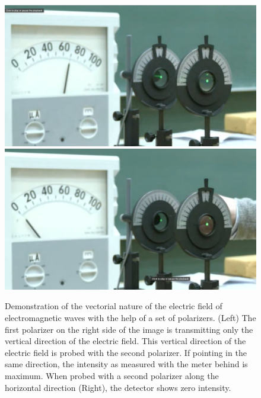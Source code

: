 \documentclass[
  a4paper,
]{book}
\begin{document}
\begin{figure}

\begin{minipage}{0.50\linewidth}
\includegraphics[width=1\linewidth,height=\textheight,keepaspectratio]{electromagnetic-waves/img/vertical_pol.png}
\includegraphics[width=1\linewidth,height=\textheight,keepaspectratio]{electromagnetic-waves/img/horizontal_pol.png}\end{minipage}%
%
\begin{minipage}{0.50\linewidth}
Demonstration of the vectorial nature of the electric field of
electromagnetic waves with the help of a set of polarizers. (Left) The
first polarizer on the right side of the image is transmitting only the
vertical direction of the electric field. This vertical direction of the
electric field is probed with the second polarizer. If pointing in the
same direction, the intensity as measured with the meter behind is
maximum. When probed with a second polarizer along the horizontal
direction (Right), the detector shows zero intensity.\end{minipage}%

\end{figure}%
\end{document}
